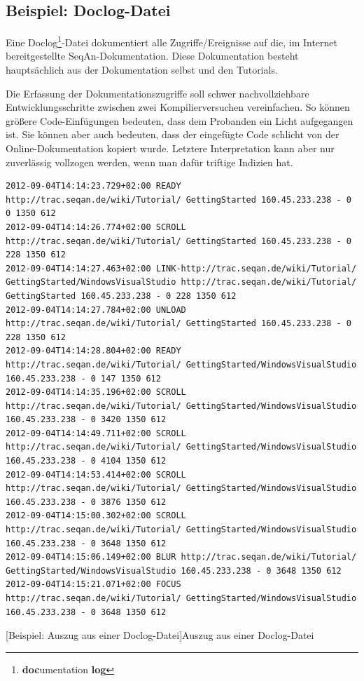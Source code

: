 \subsection{Beispiel: Doclog-Datei}
\label{sec:doclog}

Eine Doclog\footnote{\textbf{doc}umentation \textbf{log}}-Datei dokumentiert alle Zugriffe/Ereignisse auf die, im Internet bereitgestellte SeqAn-Dokumentation. Diese Dokumentation besteht hauptsächlich aus der Dokumentation selbst und den Tutorials.

Die Erfassung der Dokumentationszugriffe soll schwer nachvollziehbare Entwicklungsschritte zwischen zwei Kompilierversuchen vereinfachen. So können größere Code-Einfügungen bedeuten, dass dem Probanden ein Licht aufgegangen ist. Sie können aber auch bedeuten, dass der eingefügte Code schlicht von der Online-Dokumentation kopiert wurde. Letztere Interpretation kann aber nur zuverlässig vollzogen werden, wenn man dafür triftige Indizien hat. 

\begin{center}
\begin{verbatim}
2012-09-04T14:14:23.729+02:00 READY http://trac.seqan.de/wiki/Tutorial/ GettingStarted 160.45.233.238 - 0 0 1350 612
2012-09-04T14:14:26.774+02:00 SCROLL http://trac.seqan.de/wiki/Tutorial/ GettingStarted 160.45.233.238 - 0 228 1350 612
2012-09-04T14:14:27.463+02:00 LINK-http://trac.seqan.de/wiki/Tutorial/ GettingStarted/WindowsVisualStudio http://trac.seqan.de/wiki/Tutorial/ GettingStarted 160.45.233.238 - 0 228 1350 612
2012-09-04T14:14:27.784+02:00 UNLOAD http://trac.seqan.de/wiki/Tutorial/ GettingStarted 160.45.233.238 - 0 228 1350 612
2012-09-04T14:14:28.804+02:00 READY http://trac.seqan.de/wiki/Tutorial/ GettingStarted/WindowsVisualStudio 160.45.233.238 - 0 147 1350 612
2012-09-04T14:14:35.196+02:00 SCROLL http://trac.seqan.de/wiki/Tutorial/ GettingStarted/WindowsVisualStudio 160.45.233.238 - 0 3420 1350 612
2012-09-04T14:14:49.711+02:00 SCROLL http://trac.seqan.de/wiki/Tutorial/ GettingStarted/WindowsVisualStudio 160.45.233.238 - 0 4104 1350 612
2012-09-04T14:14:53.414+02:00 SCROLL http://trac.seqan.de/wiki/Tutorial/ GettingStarted/WindowsVisualStudio 160.45.233.238 - 0 3876 1350 612
2012-09-04T14:15:00.302+02:00 SCROLL http://trac.seqan.de/wiki/Tutorial/ GettingStarted/WindowsVisualStudio 160.45.233.238 - 0 3648 1350 612
2012-09-04T14:15:06.149+02:00 BLUR http://trac.seqan.de/wiki/Tutorial/ GettingStarted/WindowsVisualStudio 160.45.233.238 - 0 3648 1350 612
2012-09-04T14:15:21.071+02:00 FOCUS http://trac.seqan.de/wiki/Tutorial/ GettingStarted/WindowsVisualStudio 160.45.233.238 - 0 3648 1350 612
\end{verbatim}
[Beispiel: Auszug aus einer Doclog-Datei]{Auszug aus einer Doclog-Datei}
\label{lst:doclog-file}
\end{center}

